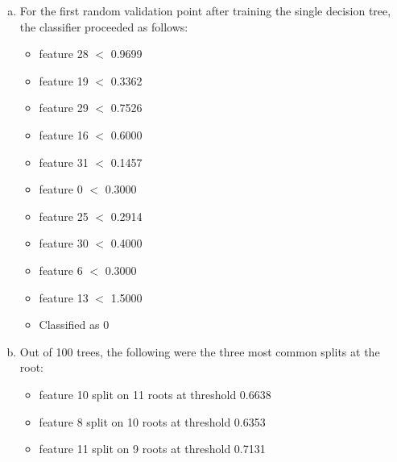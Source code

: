 \documentclass[11pt]{article}
\begin{document}
\begin{enumerate}[(a)]
\item For the first random validation point after training the single decision tree, the classifier proceeded as follows:
\begin{itemize}
\item feature 28 $<$ 0.9699
\item feature 19 $<$ 0.3362
\item feature 29 $<$ 0.7526
\item feature 16 $<$ 0.6000
\item feature 31 $<$ 0.1457
\item feature 0 $<$ 0.3000
\item feature 25 $<$ 0.2914
\item feature 30 $<$ 0.4000
\item feature 6 $<$ 0.3000
\item feature 13 $<$ 1.5000
\item Classified as 0
\end{itemize}
\item Out of 100 trees, the following were the three most common splits at the root:
\begin{itemize}
\item feature 10 split on 11 roots at threshold 0.6638
\item feature 8 split on 10 roots at threshold 0.6353
\item feature 11 split on 9 roots at threshold 0.7131
\end{itemize}
\end{enumerate}
\end{document}
